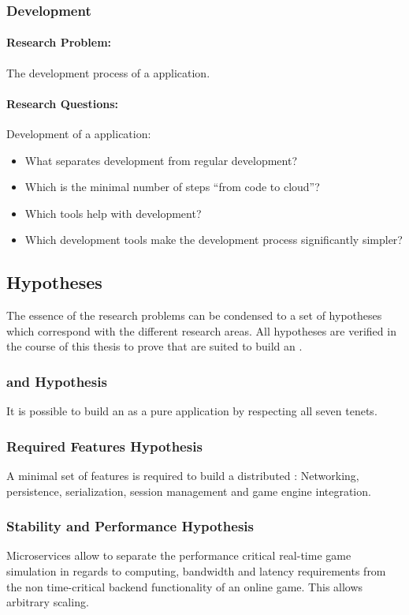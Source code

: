 \subsubsection{\ms{} Development}
\paragraph{Research Problem:} The development process of a \ms{} application.

\paragraph{Research Questions:}

Development of a \ms{} application:
\begin{itemize}
  \item What separates \ms{} development from regular development?
  \item Which is the minimal number of steps ``from code to cloud''?
  \item Which tools help with \ms{} development?
  \item Which development tools make the development process significantly
  simpler?
\end{itemize}

\subsection{Hypotheses}

The essence of the research problems can be condensed to a set of hypotheses
which correspond with the different research areas. All hypotheses are
verified in the course of this thesis to prove that \mss{} are suited to
build an \og{}. 

\subsubsection{\ogs{} and \mss{} Hypothesis}
It is possible to build an \og{} as a pure \ms{} application by
respecting all seven \ms{} tenets.

\subsubsection{Required Features Hypothesis}
A minimal set of features is required to build a distributed \og{}: Networking,
persistence, serialization, session management and game engine integration.

\subsubsection{Stability and Performance Hypothesis} 
Microservices allow to separate the performance critical real-time game
simulation in regards to computing, bandwidth and latency requirements from the
non time-critical backend functionality of an online game. This allows arbitrary
scaling.

